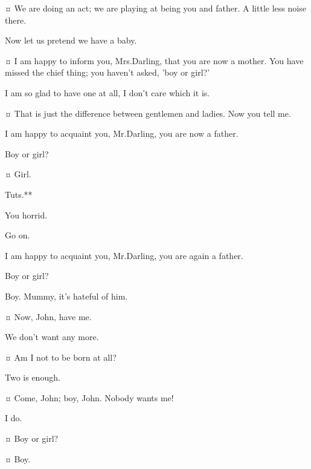 \begin{drama}
\johnspeaks {}¤
We are doing an act; we are playing at being you and father.
A little less noise there.

\wendyspeaks
Now let us pretend we have a baby.

\johnspeaks {}¤
I am happy to inform you, Mrs.\@ Darling, that you are now a mother.
You have missed the chief thing; you haven't asked, 'boy or girl?'

\wendyspeaks
I am so glad to have one at all, I don't care which it is.

\johnspeaks {}¤
That is just the difference between gentlemen and ladies.
Now you tell me.

\wendyspeaks
I am happy to acquaint you, Mr.\@ Darling, you are now a father.

\johnspeaks
Boy or girl?

\wendyspeaks {}¤
Girl.

\johnspeaks
Tuts.**

\wendyspeaks
You horrid.

\johnspeaks
Go on.

\wendyspeaks
I am happy to acquaint you, Mr.\@ Darling, you are again a father.

\johnspeaks
Boy or girl?

\wendyspeaks
Boy.
Mummy, it's hateful of him.


\michaelspeaks {}¤
Now, John, have me.

\johnspeaks
We don't want any more.

\michaelspeaks {}¤
Am I not to be born at all?

\johnspeaks
Two is enough.

\michaelspeaks {}¤
Come, John; boy, John.
Nobody wants me!

\mrsdarlingspeaks
I do.

\michaelspeaks {}¤
Boy or girl?

\mrsdarlingspeaks {}¤
Boy.


\end{drama}
